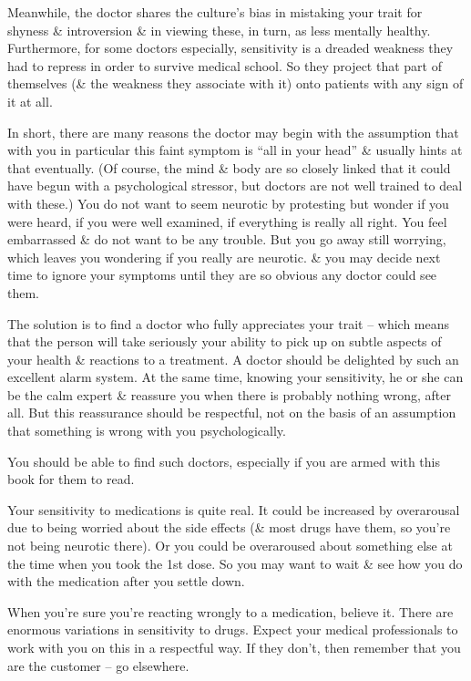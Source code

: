\documentclass{article}
\numberwithin{equation}{section}
\begin{document}
Meanwhile, the doctor shares the culture's bias in mistaking your trait for shyness \& introversion \& in viewing these, in turn, as less mentally healthy. Furthermore, for some doctors especially, sensitivity is a dreaded weakness they had to repress in order to survive medical school. So they project that part of themselves (\& the weakness they associate with it) onto patients with any sign of it at all.

In short, there are many reasons the doctor may begin with the assumption that with you in particular this faint symptom is ``all in your head'' \& usually hints at that eventually. (Of course, the mind \& body are so closely linked that it could have begun with a psychological stressor, but doctors are not well trained to deal with these.) You do not want to seem neurotic by protesting but wonder if you were heard, if you were well examined, if everything is really all right. You feel embarrassed \& do not want to be any trouble. But you go away still worrying, which leaves you wondering if you really are neurotic. \& you may decide next time to ignore your symptoms until they are so obvious any doctor could see them.

The solution is to find a doctor who fully appreciates your trait -- which means that the person will take seriously your ability to pick up on subtle aspects of your health \& reactions to a treatment. A doctor should be delighted by such an excellent alarm system. At the same time, knowing your sensitivity, he or she can be the calm expert \& reassure you when there is probably nothing wrong, after all. But this reassurance should be respectful, not on the basis of an assumption that something is wrong with you psychologically.

You should be able to find such doctors, especially if you are armed with this book for them to read.

Your sensitivity to medications is quite real. It could be increased by overarousal due to being worried about the side effects (\& most drugs have them, so you're not being neurotic there). Or you could be overaroused about something else at the time when you took the 1st dose. So you may want to wait \& see how you do with the medication after you settle down.

When you're sure you're reacting wrongly to a medication, believe it. There are enormous variations in sensitivity to drugs. Expect your medical professionals to work with you on this in a respectful way. If they don't, then remember that you are the customer -- go elsewhere.
\end{document}

